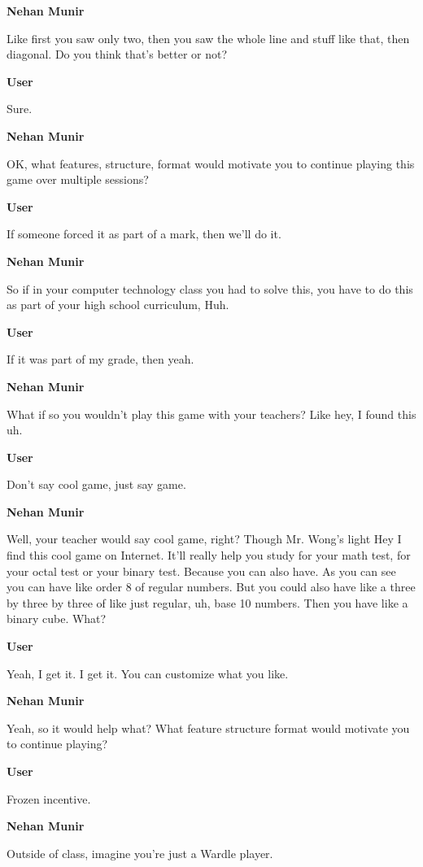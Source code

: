 \documentclass{article}
\begin{document}
\noindent \textbf{Nehan Munir}

Like first you saw only two, then you saw the whole line and stuff like that, then diagonal. Do you think that's better or not?

\noindent \textbf{User}

Sure.

\noindent \textbf{Nehan Munir}

OK, what features, structure, format would motivate you to continue playing this game over multiple sessions?

\noindent \textbf{User}

If someone forced it as part of a mark, then we'll do it.

\noindent \textbf{Nehan Munir}

So if in your computer technology class you had to solve this, you have to do this as part of your high school curriculum, Huh.

\noindent \textbf{User}

If it was part of my grade, then yeah.

\noindent \textbf{Nehan Munir}

What if so you wouldn't play this game with your teachers? Like hey, I found this uh.

\noindent \textbf{User}

Don't say cool game, just say game.

\noindent \textbf{Nehan Munir}

Well, your teacher would say cool game, right? Though Mr. Wong's light Hey I find this cool game on Internet. It'll really help you study for your math test, for your octal test or your binary test. Because you can also have. As you can see you can have like order 8 of regular numbers. But you could also have like a three by three by three of like just regular, uh, base 10 numbers. Then you have like a binary cube. What?

\noindent \textbf{User}

Yeah, I get it. I get it. You can customize what you like.

\noindent \textbf{Nehan Munir}

Yeah, so it would help what? What feature structure format would motivate you to continue playing?

\noindent \textbf{User}

Frozen incentive.

\noindent \textbf{Nehan Munir}

Outside of class, imagine you're just a Wardle player.
\end{document}
